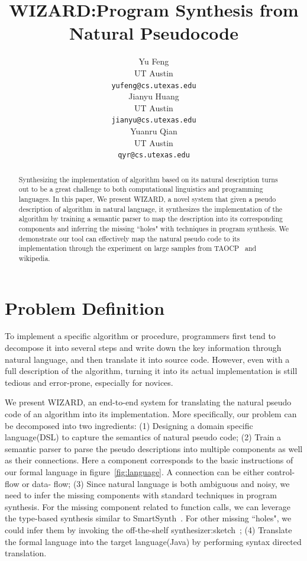 \documentclass[11pt]{article}
\title{WIZARD:Program Synthesis from Natural Pseudocode}
\author{Yu Feng \\
  UT Austin \\
  {\tt yufeng@cs.utexas.edu} \\\And
  Jianyu Huang \\
  UT Austin \\
  {\tt jianyu@cs.utexas.edu}  \\\And
    Yuanru Qian \\
  UT Austin \\
  {\tt qyr@cs.utexas.edu} \\}
\date{}
\begin{document}
\maketitle
\begin{abstract}
  Synthesizing the implementation of algorithm based on its 
  natural description turns out to be a great challenge to both 
  computational linguistics and programming languages. In this paper,
  We present WIZARD, a novel system that given a pseudo description 
  of algorithm in natural language, it synthesizes the 
  implementation of the algorithm by training a semantic parser to map
  the description into its corresponding components and 
  inferring the missing ``holes" with techniques in program synthesis.  
  We demonstrate our tool can effectively
  map the natural pseudo code to its implementation through the
  experiment on large samples from TAOCP~\cite{knuth1998art} and wikipedia.
\end{abstract}

\section{Problem Definition}
To implement a specific algorithm or procedure, programmers first tend to 
decompose it into several steps and write down the key information through
natural language, and then translate it into source code. However, even 
with a full description of the algorithm, turning it into its actual 
implementation is still tedious and error-prone, especially for novices.

We present WIZARD, an end-to-end system for translating the natural pseudo code
of an algorithm into its implementation. More specifically,
our problem can be decomposed into two ingredients: (1) Designing a domain 
specific language(DSL) to capture the semantics of natural pseudo code; 
(2) Train a semantic parser
 to parse the pseudo descriptions into multiple components as well as their connections. Here a 
 component corresponds to the basic instructions of our formal language in figure~\ref{fig:language}.
 A connection can be either control- flow or data- flow;
 (3) Since natural language is both ambiguous and noisy, we need to infer the missing 
 components with standard techniques in program synthesis. For the missing component
 related to function calls, we can leverage the type-based synthesis similar to SmartSynth~\cite{smartsyn}.
 For other missing ``holes", we could infer them by invoking the off-the-shelf synthesizer:sketch~\cite{sketch};
 (4) Translate the formal language into the target language(Java) by performing 
 syntax directed translation. 
  
\end{document}
